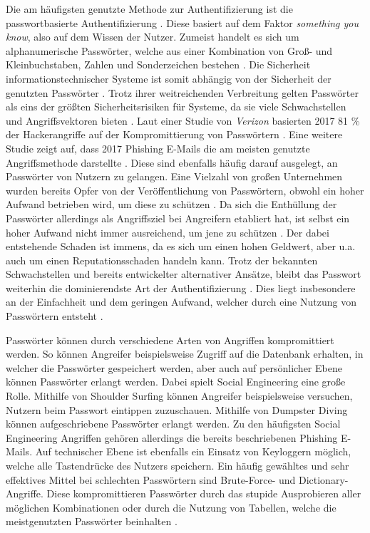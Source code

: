     Die am häufigsten genutzte Methode zur Authentifizierung ist die passwortbasierte Authentifizierung \cite{boonkrong2012security} \cite{chanda2016password} \cite{yildirim2019encouraging}. Diese basiert auf dem Faktor \textit{something you know}, also auf dem Wissen der Nutzer. Zumeist handelt es sich um alphanumerische Passwörter, welche aus einer Kombination von Groß- und Kleinbuchstaben, Zahlen und Sonderzeichen bestehen \cite{chanda2016password}. Die Sicherheit informationstechnischer Systeme ist somit abhängig von der Sicherheit der genutzten Passwörter \cite{boonkrong2012security}. Trotz ihrer weitreichenden Verbreitung gelten Passwörter als eins der größten Sicherheitsrisiken für Systeme, da sie viele Schwachstellen und Angriffsvektoren bieten \cite{yildirim2019encouraging} \cite{farke2020you}. Laut einer Studie von \textit{Verizon} basierten 2017 81 \% der Hackerangriffe auf der Kompromittierung von Passwörtern \cite{barbosa2021provable} \cite{verizon2017}. Eine weitere Studie zeigt auf, dass 2017 Phishing E-Mails die am meisten genutzte Angriffsmethode darstellte \cite{Symantec} \cite{barbosa2021provable}. Diese sind ebenfalls häufig darauf ausgelegt, an Passwörter von Nutzern zu gelangen. Eine Vielzahl von großen Unternehmen wurden bereits Opfer von der Veröffentlichung von Passwörtern, obwohl ein hoher Aufwand betrieben wird, um diese zu schützen \cite{boonkrong2012security}. Da sich die Enthüllung der Passwörter allerdings als Angriffsziel bei Angreifern etabliert hat, ist selbst ein hoher Aufwand nicht immer ausreichend, um jene zu schützen \cite{boonkrong2012security}. Der dabei entstehende Schaden ist immens, da es sich um einen hohen Geldwert, aber u.a. auch um einen Reputationsschaden handeln kann. Trotz der bekannten Schwachstellen und bereits entwickelter alternativer Ansätze, bleibt das Passwort weiterhin die dominierendste Art der Authentifizierung \cite{ives2004domino}. Dies liegt insbesondere an der Einfachheit und dem geringen Aufwand, welcher durch eine Nutzung von Passwörtern entsteht \cite{yildirim2019encouraging}.

    Passwörter können durch verschiedene Arten von Angriffen kompromittiert werden. So können Angreifer beispielsweise Zugriff auf die Datenbank erhalten, in welcher die Passwörter gespeichert werden, aber auch auf persönlicher Ebene können Passwörter erlangt werden. Dabei spielt Social Engineering eine große Rolle. Mithilfe von Shoulder Surfing können Angreifer beispielsweise versuchen, Nutzern beim Passwort eintippen zuzuschauen. Mithilfe von Dumpster Diving können aufgeschriebene Passwörter erlangt werden. Zu den häufigsten Social Engineering Angriffen gehören allerdings die bereits beschriebenen Phishing E-Mails. Auf technischer Ebene ist ebenfalls ein Einsatz von Keyloggern möglich, welche alle Tastendrücke des Nutzers speichern. Ein häufig gewähltes und sehr effektives Mittel bei schlechten Passwörtern sind Brute-Force- und Dictionary-Angriffe. Diese kompromittieren Passwörter durch das stupide Ausprobieren aller möglichen Kombinationen oder durch die Nutzung von Tabellen, welche die meistgenutzten Passwörter beinhalten \cite{chanda2016password} \cite{morii2017research}.

